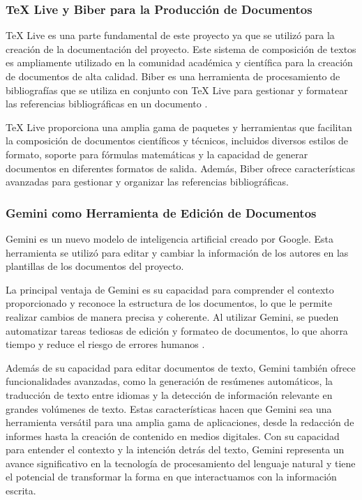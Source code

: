 \subsubsection{TeX Live y Biber para la Producción de Documentos}
TeX Live es una parte fundamental de este proyecto ya que se utilizó para la creación de la documentación del proyecto. Este sistema de composición de textos es ampliamente utilizado en la comunidad académica y científica para la creación de documentos de alta calidad. Biber es una herramienta de procesamiento de bibliografías que se utiliza en conjunto con TeX Live para gestionar y formatear las referencias bibliográficas en un documento \cite{texlive}.

TeX Live proporciona una amplia gama de paquetes y herramientas que facilitan la composición de documentos científicos y técnicos, incluidos diversos estilos de formato, soporte para fórmulas matemáticas y la capacidad de generar documentos en diferentes formatos de salida. Además, Biber ofrece características avanzadas para gestionar y organizar las referencias bibliográficas.


\subsubsection{Gemini como Herramienta de Edición de Documentos}
Gemini es un nuevo modelo de inteligencia artificial creado por Google. Esta herramienta se utilizó para editar y cambiar la información de los autores en las plantillas de los documentos del proyecto. 

La principal ventaja de Gemini es su capacidad para comprender el contexto proporcionado y reconoce la estructura de los documentos, lo que le permite realizar cambios de manera precisa y coherente. Al utilizar Gemini, se pueden automatizar tareas tediosas de edición y formateo de documentos, lo que ahorra tiempo y reduce el riesgo de errores humanos \cite{gemini}.

Además de su capacidad para editar documentos de texto, Gemini también ofrece funcionalidades avanzadas, como la generación de resúmenes automáticos, la traducción de texto entre idiomas y la detección de información relevante en grandes volúmenes de texto. Estas características hacen que Gemini sea una herramienta versátil para una amplia gama de aplicaciones, desde la redacción de informes hasta la creación de contenido en medios digitales. Con su capacidad para entender el contexto y la intención detrás del texto, Gemini representa un avance significativo en la tecnología de procesamiento del lenguaje natural y tiene el potencial de transformar la forma en que interactuamos con la información escrita.


